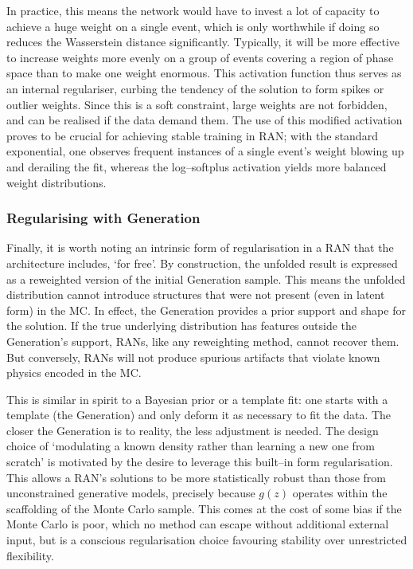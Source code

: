 {{            In practice, this means the network would have to invest a lot of capacity to achieve a huge weight on a single event, which is only worthwhile if doing so reduces the Wasserstein distance significantly.
            Typically, it will be more effective to increase weights more evenly on a group of events covering a region of phase space than to make one weight enormous.
            This activation function thus serves as an internal regulariser, curbing the tendency of the solution to form spikes or outlier weights.
           Since this is a soft constraint, large weights are not forbidden, and can be realised if the data demand them.
            The use of this modified activation proves to be crucial for achieving stable training in RAN; with the standard exponential, one observes frequent instances of a single event’s weight blowing up and derailing the fit, whereas the log--softplus activation yields more balanced weight distributions.
            
        \subsubsection{Regularising with Generation}
            Finally, it is worth noting an intrinsic form of regularisation in a RAN that the architecture includes, `for free'.
            By construction, the unfolded result is expressed as a reweighted version of the initial Generation sample.
            This means the unfolded distribution cannot introduce structures that were not present (even in latent form) in the MC.
            In effect, the Generation provides a prior support and shape for the solution.
            If the true underlying distribution has features outside the Generation’s support, RANs, like any reweighting method, cannot recover them.
            But conversely, RANs will not produce spurious artifacts that violate known physics encoded in the MC.
            
            This is similar in spirit to a Bayesian prior or a template fit: one starts with a template (the Generation) and only deform it as necessary to fit the data.
            The closer the Generation is to reality, the less adjustment is needed.
            The design choice of `modulating a known density rather than learning a new one from scratch' is motivated by the desire to leverage this built--in form regularisation.
            This allows a RAN’s solutions to be more statistically robust than those from unconstrained generative models, precisely because $g(z)$ operates within the scaffolding of the Monte Carlo sample.
            This comes at the cost of some bias if the Monte Carlo is poor, which no method can escape without additional external input, but is a conscious regularisation choice favouring stability over unrestricted flexibility.

}}
